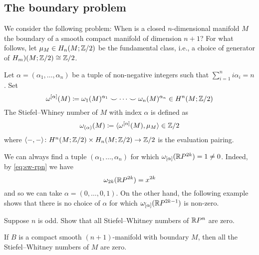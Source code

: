 \documentclass[ma3408.tex]{subfiles}
\begin{document}
\subsection*{The boundary problem}
We consider the following problem: When is a closed $n$-dimensional manifold $M$ the boundary of a smooth compact manifold of dimension $n+1$? For what follows, let $\mu_M \in H_n(M;\mathbb{Z}/2)$ be the fundamental class, i.e., a choice of generator of $H_m)(M;\mathbb{Z}/2) \cong \mathbb{Z}/2$. 
\begin{Def}
Let $\alpha = (\alpha_1,\ldots,\alpha_n)$ be a tuple of non-negative integers such that $\sum_{i= 1}^n i\alpha_i = n$. Set
\[
\omega^{[\alpha]}(M) \coloneqq \omega_1(M)^{\alpha_1} \smile \cdots \smile \omega_n(M)^{\alpha_n} \in H^n(M;\mathbb{Z}/2)
\]
The Stiefel--Whiney number of $M$ with index $\alpha$ is defined as 
\[
\omega_{(\alpha)}(M) \coloneqq \langle \omega^{[\alpha]}(M),\mu_M \rangle \in \mathbb{Z}/2
\]
where $\langle -,-\rangle \colon H^n(M;\mathbb{Z}/2) \times H_n(M;\mathbb{Z}/2) \to \mathbb{Z}/2$ is the evaluation pairing.
\end{Def}
\begin{Exa}
We can always find a tuple $(\alpha_1,\ldots,\alpha_n)$ for which $\omega_{[\alpha]}(\mathbb{R} P^{2k})  = 1 \ne 0$. Indeed, by \eqref{eq:sw-rpn} we have
\[
\omega_{2k}(\mathbb{R} P^{2k}) = x^{2k}
\]
and so we can take $\alpha = (0,\ldots,0,1)$. On the other hand, the following example shows that there is no choice of $\alpha$ for which $\omega_{[\alpha]}(\mathbb{R} P^{2k-1})$ is non-zero. 
\end{Exa}
\begin{exercise}
Suppose $n$ is odd. Show that all Stiefel–Whitney numbers of $\mathbb{R} P^n$ are zero.
\end{exercise}
\begin{Thm}[Pontryagin]
If $B$ is a compact smooth $(n+1)$-manifold with boundary $M$, then all the Stiefel--Whitney numbers of $M$ are zero.
\end{Thm}
\end{document}
